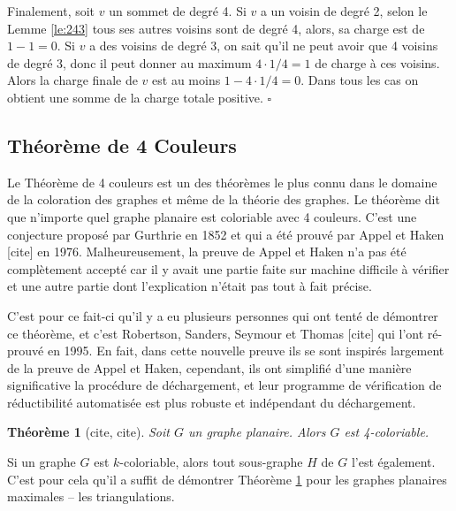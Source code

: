 \documentclass[10pt,a4paper]{article}
\newtheorem{theorem}{Théorème}
\newcommand{\ep}{{\hfill $\square$}}
\begin{document}
Finalement, soit $v$ un sommet de degré 4. Si $v$ a un voisin de degré 2, selon le Lemme \ref{le:243} tous ses autres voisins sont de degré 4, alors, sa charge est de $1-1=0$. Si $v$ a des voisins de degré 3, on sait qu'il ne peut avoir que 4 voisins de degré 3, donc il peut donner au maximum $4 \cdot 1/4=1$ de charge à ces voisins. Alors la charge finale de $v$ est au moins $1 - 4\cdot 1/4 = 0$. Dans tous les cas on obtient une somme de la charge totale positive.
\ep 


\subsection{Théorème de 4 Couleurs}

Le Théorème de 4 couleurs est un des théorèmes le plus connu dans le domaine de la coloration des graphes et même de la théorie des graphes. Le théorème dit que n'importe quel graphe planaire est coloriable avec 4 couleurs. C'est une conjecture proposé par Gurthrie en 1852 et qui a été prouvé par Appel et Haken [cite] en 1976. Malheureusement, la preuve de Appel et Haken n'a pas été complètement accepté car il y avait une partie faite sur machine difficile à vérifier et une autre partie dont l'explication n'était pas tout à fait précise.

C'est pour ce fait-ci qu'il y a eu plusieurs personnes qui ont tenté de démontrer ce théorème, et c'est Robertson, Sanders, Seymour et Thomas [cite] qui l'ont ré-prouvé en 1995. En fait, dans cette nouvelle preuve ils se sont inspirés largement de la preuve de Appel et Haken, cependant, ils ont simplifié d'une manière significative la procédure de déchargement, et leur programme de vérification de réductibilité automatisée est plus robuste et indépendant du déchargement.

\begin{theorem}[cite, cite]
Soit $G$ un graphe planaire. Alors $G$ est 4-coloriable.
\label{th:4CT}
\end{theorem}

Si un graphe $G$ est $k$-coloriable, alors tout sous-graphe $H$ de $G$ l'est également. C'est pour cela qu'il a suffit de démontrer Théorème \ref{th:4CT} pour les graphes planaires maximales -- les triangulations.
\end{document}
